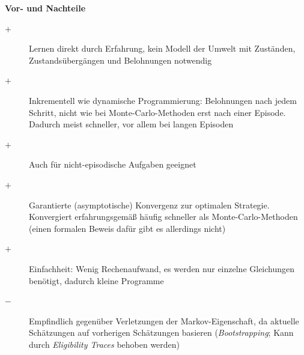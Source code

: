 \documentclass[10pt]{scrartcl}
\begin{document}
\vspace{1em}
\textbf{Vor- und Nachteile}
\begin{description}
\item[$+$] Lernen direkt durch Erfahrung, kein Modell der Umwelt mit Zuständen, Zustandsübergängen und Belohnungen notwendig
\item[$+$] Inkrementell wie dynamische Programmierung: Belohnungen nach jedem Schritt, nicht wie bei Monte-Carlo-Methoden erst nach einer Episode. Dadurch meist schneller, vor allem bei langen Episoden
\item[$+$] Auch für nicht-episodische Aufgaben geeignet
\item[$+$] Garantierte (asymptotische) Konvergenz zur optimalen Strategie. Konvergiert erfahrungsgemäß häufig schneller als Monte-Carlo-Methoden (einen formalen Beweis dafür gibt es allerdings nicht)
\item[$+$] Einfachheit: Wenig Rechenaufwand, es werden nur einzelne Gleichungen benötigt, dadurch kleine Programme
\item[$-$] Empfindlich gegenüber Verletzungen der Markov-Eigenschaft, da aktuelle Schätzungen auf vorherigen Schätzungen basieren (\emph{Bootstrapping}; Kann durch \emph{Eligibility Traces} behoben werden)
\end{description}


  	

\listoftodos
\end{document}
